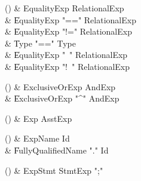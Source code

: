 \begin{bbgrammarappendix}{3.9in}

() & EqualityExp \label{prod:EqualityExp}  \: RelationalExp  \\

 &    \| EqualityExp \xcd"==" RelationalExp \\
 &    \| EqualityExp \xcd"!=" RelationalExp \\
 &    \| Type  \xcd"==" Type  \\
 &    \| EqualityExp \xcd"~" RelationalExp \\
 &    \| EqualityExp \xcd"!~" RelationalExp \\

\end{bbgrammarappendix}

\begin{bbgrammarappendix}{3.6in}

() & ExclusiveOrExp \label{prod:ExclusiveOrExp}  \: AndExp  \\

 &    \| ExclusiveOrExp \xcd"^" AndExp \\

\end{bbgrammarappendix}

\begin{bbgrammarappendix}{4.7in}

() & Exp \label{prod:Exp}  \: AsstExp  \\


\end{bbgrammarappendix}

\begin{bbgrammarappendix}{4.3in}

() & ExpName \label{prod:ExpName}  \: Id  \\

 &    \| FullyQualifiedName \xcd"." Id \\

\end{bbgrammarappendix}

\begin{bbgrammarappendix}{4.3in}

() & ExpStmt \label{prod:ExpStmt}  \: StmtExp \xcd";"  \\


\end{bbgrammarappendix}

